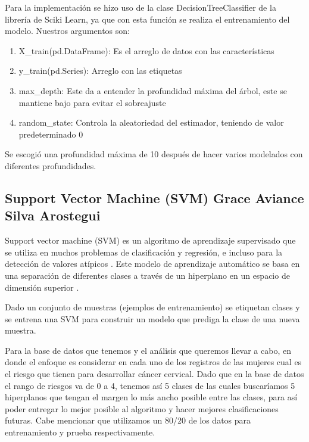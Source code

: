 \documentclass[journal]{IEEEtran}                                                          %
\begin{document}
                Para la implementación se hizo uso de la clase DecisionTreeClassifier de la librería de Sciki Learn, ya que con esta función se realiza el entrenamiento del modelo. Nuestros argumentos son:
                \begin{enumerate}
                    \item X\_train(pd.DataFrame): Es el arreglo de datos con las características
                    \item y\_train(pd.Series): Arreglo con las etiquetas
                    \item max\_depth: Este da a entender la profundidad máxima del árbol, este se mantiene bajo para evitar el sobreajuste
                    \item random\_state: Controla la aleatoriedad del estimador, teniendo de valor predeterminado 0
                \end{enumerate}
                
                Se escogió una profundidad máxima de 10 después de hacer varios modelados con diferentes profundidades.
        
        \subsection{Support Vector Machine (SVM) Grace Aviance Silva Arostegui} \label{svm}
            
            Support vector machine  (SVM) es un algoritmo de aprendizaje supervisado que se utiliza en muchos problemas de clasificación y regresión, e incluso para la detección de valores atípicos \cite{geron-2019}. Este modelo de aprendizaje automático se basa en una separación de diferentes clases a través de un hiperplano en un espacio de dimensión superior \cite{deisenroth2020mathematics} \cite{mathworks-2022}.

            Dado un conjunto de muestras (ejemplos de entrenamiento) se etiquetan clases y se entrena una SVM para construir un modelo que prediga la clase de una nueva muestra.

            Para la base de datos que tenemos y el análisis que queremos llevar a cabo, en donde el enfoque es considerar en cada uno de los registros de las mujeres cual es el riesgo que tienen para desarrollar cáncer cervical. Dado que en la base de datos el rango de riesgos va de 0 a 4, tenemos así 5 clases de las cuales buscaríamos 5 hiperplanos que tengan el margen lo más ancho posible entre las clases, para así poder entregar lo mejor posible al algoritmo y hacer mejores clasificaciones futuras. Cabe mencionar que utilizamos un 80/20 de los datos para entrenamiento y prueba respectivamente.
\end{document}
